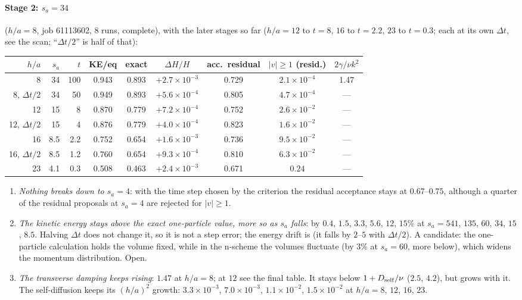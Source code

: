 \documentclass[11pt,aps,preprint,nofootinbib,superscriptaddress,tightenlines]{revtex4-2}
\let\oldparagraph\paragraph
\renewcommand{\paragraph}{\par\bigskip\oldparagraph}
\begin{document}
\paragraph{Stage 2: $s_a=34$} ($h/a=8$, job 61113602, 8 runs, complete), with the later stages so far
($h/a=12$ to $t=8$, $16$ to $t=2.2$, $23$ to $t=0.3$; each at its own $\Delta t$, see the scan; ``$\Delta t/2$''
is half of that):
\begin{center}
\begin{tabular}{rrrcccccc}
\hline
$h/a$ & $s_a$ & $t$ & KE/eq & exact & $\Delta H/H$ & acc.\ residual & $|v|\ge1$ (resid.) & $2\gamma/\nu k^2$ \\ \hline
8 & 34 & 100 & 0.943 & 0.893 & $+2.7\times10^{-3}$ & 0.729 & $2.1\times10^{-4}$ & 1.47 \\
8, $\Delta t/2$ & 34 & 50 & 0.949 & 0.893 & $+5.6\times10^{-4}$ & 0.805 & $4.7\times10^{-4}$ & --- \\
12 & 15 & 8 & 0.870 & 0.779 & $+7.2\times10^{-4}$ & 0.752 & $2.6\times10^{-2}$ & --- \\
12, $\Delta t/2$ & 15 & 4 & 0.876 & 0.779 & $+4.0\times10^{-4}$ & 0.823 & $1.6\times10^{-2}$ & --- \\
16 & 8.5 & 2.2 & 0.752 & 0.654 & $+1.6\times10^{-3}$ & 0.736 & $9.5\times10^{-2}$ & --- \\
16, $\Delta t/2$ & 8.5 & 1.2 & 0.760 & 0.654 & $+9.3\times10^{-4}$ & 0.810 & $6.3\times10^{-2}$ & --- \\
23 & 4.1 & 0.3 & 0.508 & 0.463 & $+2.4\times10^{-3}$ & 0.671 & $0.24$ & --- \\
\hline
\end{tabular}
\end{center}
\begin{enumerate}
\item \emph{Nothing breaks down to $s_a=4$}: with the time step chosen by the criterion the residual
  acceptance stays at $0.67$--$0.75$, although a quarter of the residual proposals at $s_a=4$ are
  rejected for $|v|\ge1$.
\item \emph{The kinetic energy stays above the exact one-particle value, more so as $s_a$ falls}:
  by $0.4$, $1.5$, $3.3$, $5.6$, $12$, $15\%$ at $s_a=541$, $135$, $60$, $34$, $15$, $8.5$.  Halving $\Delta t$ does not
  change it, so it is not a step error; the energy drift is (it falls by $2$--$5$ with $\Delta t/2$).  A
  candidate: the one-particle calculation holds the volume fixed, while in the n-scheme the volumes
  fluctuate (by $3\%$ at $s_a=60$, more below), which widens the momentum distribution.  Open.
\item \emph{The transverse damping keeps rising}: $1.47$ at $h/a=8$; at $12$ see the final table.  It stays below $1+D_{\rm self}/\nu$ ($2.5$, $4.2$), but grows with
  it.  The self-diffusion keeps its $(h/a)^2$ growth: $3.3\times10^{-3}$, $7.0\times10^{-3}$, $1.1\times10^{-2}$,
  $1.5\times10^{-2}$ at $h/a=8$, $12$, $16$, $23$.
\end{enumerate}
\end{document}
